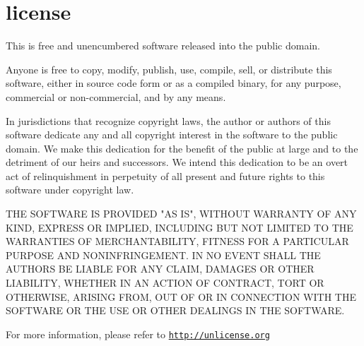 \chapter{license }
\hypertarget{md__mono_engine_2thirdparty_2tracy_2examples_2_toy_path_tracer_2license}{}\label{md__mono_engine_2thirdparty_2tracy_2examples_2_toy_path_tracer_2license}
This is free and unencumbered software released into the public domain.

Anyone is free to copy, modify, publish, use, compile, sell, or distribute this software, either in source code form or as a compiled binary, for any purpose, commercial or non-\/commercial, and by any means.

In jurisdictions that recognize copyright laws, the author or authors of this software dedicate any and all copyright interest in the software to the public domain. We make this dedication for the benefit of the public at large and to the detriment of our heirs and successors. We intend this dedication to be an overt act of relinquishment in perpetuity of all present and future rights to this software under copyright law.

THE SOFTWARE IS PROVIDED "{}\+AS IS"{}, WITHOUT WARRANTY OF ANY KIND, EXPRESS OR IMPLIED, INCLUDING BUT NOT LIMITED TO THE WARRANTIES OF MERCHANTABILITY, FITNESS FOR A PARTICULAR PURPOSE AND NONINFRINGEMENT. IN NO EVENT SHALL THE AUTHORS BE LIABLE FOR ANY CLAIM, DAMAGES OR OTHER LIABILITY, WHETHER IN AN ACTION OF CONTRACT, TORT OR OTHERWISE, ARISING FROM, OUT OF OR IN CONNECTION WITH THE SOFTWARE OR THE USE OR OTHER DEALINGS IN THE SOFTWARE.

For more information, please refer to \href{http://unlicense.org}{\texttt{http:\+/\+/\+unlicense.\+org}} 